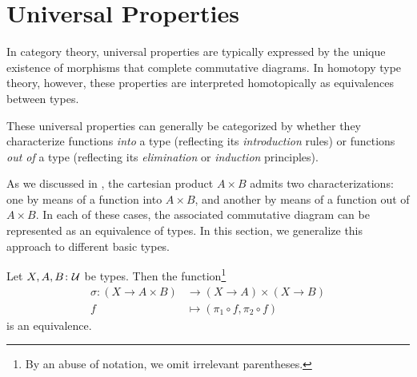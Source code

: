 \section{Universal Properties}

In category theory, universal properties are typically expressed by the unique existence of morphisms that complete commutative diagrams. In homotopy type theory, however, these properties are interpreted homotopically as equivalences between types. 

These universal properties can generally be categorized by whether they characterize functions \emph{into} a type (reflecting its \textsl{introduction} rules) or functions \emph{out of} a type (reflecting its \textsl{elimination} or \textsl{induction} principles).

As we discussed in , the cartesian product $A\times B$ admits two characterizations: one by means of a function into $A\times B$, and another by means of a function out of $A\times B$. In each of these cases, the associated commutative diagram can be represented as an equivalence of types. In this section, we generalize this approach to different basic types.

\begin{thm}\fe
    Let\/ $X,A,B\colon\univ$ be types. Then the function\footnote{By an abuse of notation, we omit irrelevant parentheses.}
    \begin{align*}
        \sigma\colon(X\to A\times B)&\to(X\to A)\times(X\to B)\\
        f&\mapsto(\pi_1\circ f,\pi_2\circ f)
    \end{align*}
    is an equivalence.
\end{thm}

